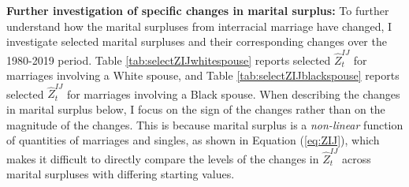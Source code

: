 \vspace{3mm}


\noindent \textbf{Further investigation of specific changes in marital surplus:} To further understand how the marital surpluses from interracial marriage have changed, I investigate selected marital surpluses and their corresponding changes over the 1980-2019 period. Table \ref{tab:selectZIJwhitespouse} reports selected $\hat{Z}^{IJ}_t$ for marriages involving a White spouse, and Table \ref{tab:selectZIJblackspouse} reports selected $\hat{Z}^{IJ}_t$ for marriages involving a Black spouse. When describing the changes in marital surplus below, I focus on the sign of the changes rather than on the magnitude of the changes. This is because marital surplus is a \textit{non-linear} function of quantities of marriages and singles, as shown in Equation (\ref{eq:ZIJ}), which makes it difficult to directly compare the levels of the changes in $\hat{Z}^{IJ}_t$ across marital surpluses with differing starting values. 




